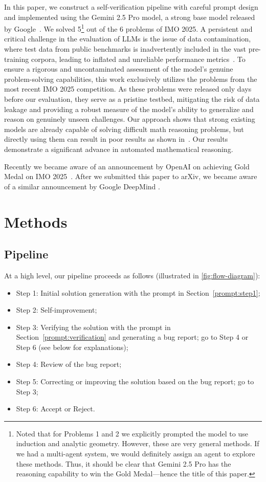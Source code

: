 \documentclass[12pt]{article}
\begin{document}
In this paper, we construct a self-verification pipeline with careful prompt design and implemented using the Gemini 2.5 Pro model, a strong base model released by Google~\cite{gemini2025blog}. We solved 5\footnote{Noted that for Problems 1 and 2 we explicitly prompted the model to use induction and analytic geometry. However, these are very general methods. If we had a multi-agent system, we would definitely assign an agent to explore these methods. Thus, it should be clear that Gemini 2.5 Pro has the reasoning capability to win the Gold Medal---hence the title of this paper.} out of the 6 problems of IMO 2025. A persistent and critical challenge in the evaluation of LLMs is the issue of data contamination, where test data from public benchmarks is inadvertently included in the vast pre-training corpora, leading to inflated and unreliable performance metrics~\cite{dodge2021documenting, zhou2024dont}. To ensure a rigorous and uncontaminated assessment of the model’s genuine problem-solving capabilities, this work exclusively utilizes the problems from the most recent IMO 2025 competition. As these problems were released only days before our evaluation, they serve as a pristine testbed, mitigating the risk of data leakage and providing a robust measure of the model’s ability to generalize and reason on genuinely unseen challenges. Our approach shows that strong existing models are already capable of solving difficult math reasoning problems, but directly using them can result in poor results as shown in~\cite{matharena2025}. Our results demonstrate a significant advance in automated mathematical reasoning.

Recently we became aware of an announcement by OpenAI on achieving Gold Medal on IMO 2025~\cite{wei2025openai}. After we submitted this paper to arXiv, we became aware of a similar announcement by Google DeepMind \cite{Deepmind}.

\section{Methods}

\subsection{Pipeline}

At a high level, our pipeline proceeds as follows (illustrated in \ref{fig:flow-diagram}):

\begin{itemize}
    \item Step 1: Initial solution generation with the prompt in Section~\ref{prompt:step1};
    \item Step 2: Self-improvement;
    \item Step 3: Verifying the solution with the prompt in Section~\ref{prompt:verification} and generating a bug report; go to Step 4 or Step 6 (see below for explanations);
    \item Step 4: Review of the bug report;
    \item Step 5: Correcting or improving the solution based on the bug report; go to Step 3;
    \item Step 6: Accept or Reject.
\end{itemize}
\end{document}
